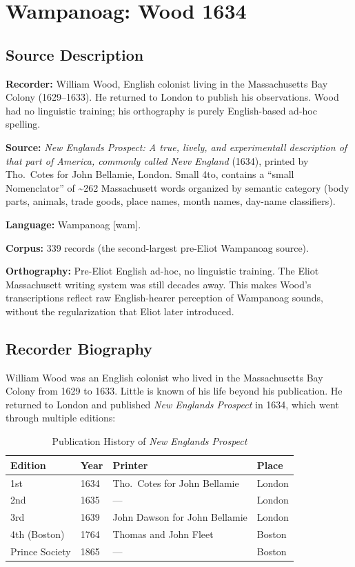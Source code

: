 
\section{Wampanoag: Wood 1634}
\label{sec:1367}

\subsection{Source Description}

\textbf{Recorder:} William Wood, English colonist living in the Massachusetts
Bay Colony (1629--1633). He returned to London to publish his observations.
Wood had no linguistic training; his orthography is purely English-based ad-hoc
spelling.

\textbf{Source:} \emph{New Englands Prospect: A true, lively, and experimentall
description of that part of America, commonly called Nevv England} (1634),
printed by Tho.\ Cotes for John Bellamie, London. Small 4to, contains a ``small
Nomenclator'' of \textasciitilde262 Massachusett words organized by semantic
category (body parts, animals, trade goods, place names, month names,
day-name classifiers).

\textbf{Language:} Wampanoag [wam].

\textbf{Corpus:} 339 records (the second-largest pre-Eliot Wampanoag source).

\textbf{Orthography:} Pre-Eliot English ad-hoc, no linguistic training. The
Eliot Massachusett writing system was still decades away. This makes Wood's
transcriptions reflect raw English-hearer perception of Wampanoag sounds,
without the regularization that Eliot later introduced.

\subsection{Recorder Biography}

William Wood was an English colonist who lived in the Massachusetts Bay Colony
from 1629 to 1633. Little is known of his life beyond his publication. He
returned to London and published \emph{New Englands Prospect} in 1634, which
went through multiple editions:

\begin{table}[htbp]
\centering
\caption{Publication History of \emph{New Englands Prospect}}
\label{tab:1367-editions}
\begin{tabular}{llll}
\hline
Edition & Year & Printer & Place \\
\hline
1st & 1634 & Tho.\ Cotes for John Bellamie & London \\
2nd & 1635 & --- & London \\
3rd & 1639 & John Dawson for John Bellamie & London \\
4th (Boston) & 1764 & Thomas and John Fleet & Boston \\
Prince Society & 1865 & --- & Boston \\
\hline
\end{tabular}
\end{table}

